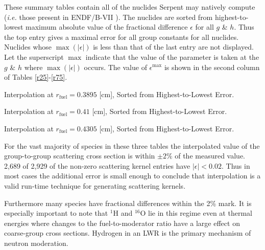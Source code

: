 \documentclass{physor2012}
\newcommand{\superscript}[1]{\ensuremath{^{\textrm{#1}}}}
\newcommand{\nuc}[2]{\superscript{#2}{#1}}
\begin{document}
These summary tables contain all of the nuclides Serpent may natively compute
(\emph{i.e.} those present in ENDF/B-VII \cite{CHADWICK2006}).  The nuclides are sorted from
highest-to-lowest maximum absolute value of the fractional difference $\epsilon$
for all $g$ \& $h$.  Thus the top entry gives a maximal error for all group
constants for all nuclides.  Nuclides whose $\max(|\epsilon|)$ is less than
that of the last entry are not displayed.  Let the superscript $\max$ indicate that the
value of the parameter is taken at the $g$ \& $h$ where $\max(|\epsilon|)$ occurs.
The value of $\epsilon^{\max}$ is shown in the second column of Tables \ref{r25}-\ref{r75}.
\begin{table}[htbp]
\begin{center}
\caption{Interpolation at $r_{\mbox{fuel}}=0.3895$ [cm], Sorted from Highest-to-Lowest Error.}
\label{r25}

\end{center}
\end{table}

\begin{table}[htbp]
\begin{center}
\caption{Interpolation at $r_{\mbox{fuel}}=0.41$ [cm], Sorted from Highest-to-Lowest Error.}
\label{r50}

\end{center}
\end{table}

\begin{table}[htbp]
\begin{center}
\caption{Interpolation at $r_{\mbox{fuel}}=0.4305$ [cm], Sorted from Highest-to-Lowest Error.}
\label{r75}

\end{center}
\end{table}

For the vast majority of species in these three tables the interpolated value of
the group-to-group scattering cross section is within $\pm 2\%$ of the measured
value.  2,689 of 2,929 of the non-zero scattering kernel entries have $|\epsilon| < 0.02$.  
Thus in most cases the additional error is small enough 
to conclude that interpolation is a valid run-time technique for generating scattering kernels.

Furthermore many species have fractional differences within the 2\% mark.
It is especially important to note that \nuc{H}{1} and \nuc{O}{16} lie in
this regime even at thermal energies where changes to the fuel-to-moderator ratio have a large effect on coarse-group cross sections.  Hydrogen in an LWR is the primary mechanism of neutron
moderation.  
\end{document}
